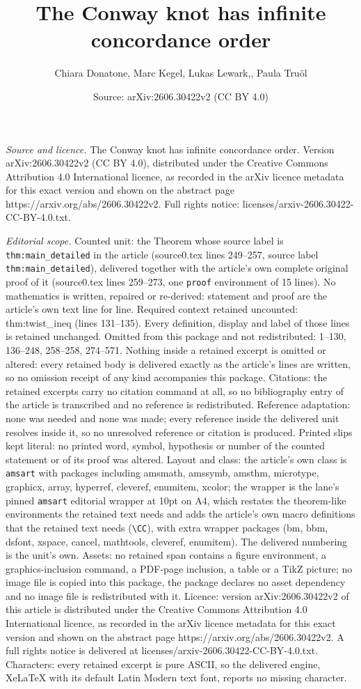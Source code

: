\documentclass[10pt,a4paper]{amsart}
\title[The Conway knot has infinite concordance order]{The Conway knot has infinite concordance order}
\author{Chiara Donatone, Marc Kegel, Lukas Lewark,, Paula Tru\"ol}
\date{Source: arXiv:2606.30422v2 (CC BY 4.0)}
\begin{document}
\maketitle

\noindent\emph{Source and licence.} The Conway knot has infinite concordance order. Version arXiv:2606.30422v2 (CC BY 4.0), distributed under the Creative Commons Attribution 4.0 International licence, as recorded in the arXiv licence metadata for this exact version and shown on the abstract page https://arxiv.org/abs/2606.30422v2. Full rights notice: licenses/arxiv-2606.30422-CC-BY-4.0.txt.\par\smallskip

\noindent\textit{Editorial scope.} Counted unit: the Theorem whose source label is \texttt{thm:main\_detailed} in the article (source0.tex lines 249--257, source label \texttt{thm:main\_detailed}), delivered together with the article's own complete original proof of it (source0.tex lines 259--273, one \texttt{proof} environment of 15 lines). No mathematics is written, repaired or re-derived: statement and proof are the article's own text line for line. Required context retained uncounted: thm:twist\_ineq (lines 131--135). Every definition, display and label of those lines is retained unchanged. Omitted from this package and not redistributed: 1--130, 136--248, 258--258, 274--571. Nothing inside a retained excerpt is omitted or altered: every retained body is delivered exactly as the article's lines are written, so no omission receipt of any kind accompanies this package. Citations: the retained excerpts carry no citation command at all, so no bibliography entry of the article is transcribed and no reference is redistributed. Reference adaptation: none was needed and none was made; every reference inside the delivered unit resolves inside it, so no unresolved reference or citation is produced. Printed slips kept literal: no printed word, symbol, hypothesis or number of the counted statement or of its proof was altered. Layout and class: the article's own class is \texttt{amsart} with packages including amsmath, amssymb, amsthm, microtype, graphicx, array, hyperref, cleveref, enumitem, xcolor; the wrapper is the lane's pinned \texttt{amsart} editorial wrapper at 10pt on A4, which restates the theorem-like environments the retained text needs and adds the article's own macro definitions that the retained text needs (\texttt{\textbackslash CC}), with extra wrapper packages (bm, bbm, dsfont, xspace, cancel, mathtools, cleveref, enumitem). The delivered numbering is the unit's own. Assets: no retained span contains a figure environment, a graphics-inclusion command, a PDF-page inclusion, a table or a TikZ picture; no image file is copied into this package, the package declares no asset dependency and no image file is redistributed with it. Licence: version arXiv:2606.30422v2 of this article is distributed under the Creative Commons Attribution 4.0 International licence, as recorded in the arXiv licence metadata for this exact version and shown on the abstract page https://arxiv.org/abs/2606.30422v2. A full rights notice is delivered at licenses/arxiv-2606.30422-CC-BY-4.0.txt. Characters: every retained excerpt is pure ASCII, so the delivered engine, XeLaTeX with its default Latin Modern text font, reports no missing character.
\end{document}
